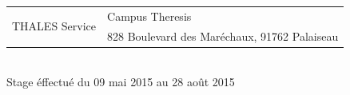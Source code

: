 \begin{titlepage}
\begin{center}
		\vfill

		\begin{tabular}{r|l}
			\multirow{2}{*}{THALES Service}& Campus Theresis\\
			       & 828 Boulevard des Maréchaux, 91762 Palaiseau 
		\end{tabular}\\[1cm]
		Stage éffectué du 09 mai 2015 au 28 août 2015\\[0.2cm]
	\end{center}

\end{titlepage}


